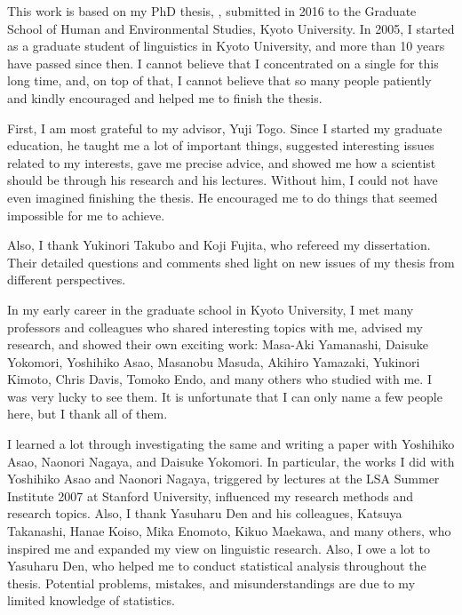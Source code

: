 \begin{refsection}

This work is based on my PhD thesis,
,
submitted in 2016 to the Graduate School of Human and Environmental Studies, Kyoto University.
In 2005, I started as a graduate student of linguistics in Kyoto University, and more than 10 years have passed since then.
I cannot believe that I concentrated on a single  for this long time,
and, on top of that,
I cannot believe that so many people patiently and kindly
encouraged and helped me to finish the thesis.

First, I am most grateful to my advisor, Yuji Togo.
Since I started my graduate education,
he taught me a lot of important things,
suggested interesting issues related to my interests,
gave me precise advice, and
showed me how a scientist should be through his research and his lectures.
Without him,
I could not have even imagined finishing the thesis.
He encouraged me to do things that seemed impossible for me to achieve.

Also, I thank Yukinori Takubo and Koji Fujita,
who refereed my dissertation.
Their detailed questions and comments shed light on new issues of my thesis
from different perspectives.

In my early career in the graduate school in Kyoto University,
I met many professors and colleagues who shared interesting topics with me, advised my research, and showed their own exciting work:
Masa-Aki Yamanashi, Daisuke Yokomori, Yoshihiko Asao, Masanobu Masuda, Akihiro Yamazaki, Yukinori Kimoto, Chris Davis, Tomoko Endo, and many others who studied with me.
I was very lucky to see them.
It is unfortunate that I can only name a few people here, but I thank all of them.

I learned a lot through investigating the same  and writing a paper with Yoshihiko Asao, Naonori Nagaya, and Daisuke Yokomori.
In particular, the works I did with Yoshihiko Asao and Naonori Nagaya,
triggered by lectures at the LSA Summer Institute 2007 at Stanford University,
influenced my research methods and research topics.
Also, I thank Yasuharu Den and his colleagues, Katsuya Takanashi, Hanae Koiso, Mika Enomoto, Kikuo Maekawa, and many others,
who inspired me and expanded my view on linguistic research.
Also, I owe a lot to Yasuharu Den, who helped me to conduct statistical analysis
throughout the thesis.
Potential problems, mistakes, and misunderstandings are due to my limited knowledge of statistics.


\end{refsection}
